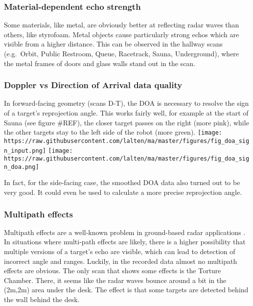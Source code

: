 \subsubsection{Material-dependent echo
strength}\label{material-dependent-echo-strength}

Some materials, like metal, are obviously better at reflecting radar
waves than others, like styrofoam. Metal objects cause particularly
strong echos which are visible from a higher distance. This can be
observed in the hallway scans (e.g.~Orbit, Public Restroom, Queue,
Racetrack, Sauna, Underground), where the metal frames of doors and
glass walls stand out in the scan.

\subsubsection{Doppler vs Direction of Arrival data
quality}\label{doppler-vs-direction-of-arrival-data-quality}

In forward-facing geometry (scans D-T), the DOA is necessary to resolve
the sign of a target's reprojection angle. This works fairly well, for
example at the start of Sauna (see figure \#REF), the closer target
passes on the right (more pink), while the other targets stay to the
left side of the robot (more green).
\texttt{[image: https://raw.githubusercontent.com/lalten/ma/master/figures/fig\_doa\_sign\_input.png]}
\texttt{[image: https://raw.githubusercontent.com/lalten/ma/master/figures/fig\_doa\_sign\_doa.png]}

In fact, for the side-facing case, the smoothed DOA data also turned out
to be very good. It could even be used to calculate a more precise
reprojection angle.

\subsubsection{Multipath effects}\label{multipath-effects}

Multipath effects are a well-known problem in ground-based radar
applications \cite{Adams2012}. In situations where multi-path effects
are likely, there is a higher possibility that multiple versions of a
target's echo are visible, which can lead to detection of incorrect
angle and ranges. Luckily, in the recorded data almost no multipath
effects are obvious. The only scan that shows some effects is the
Torture Chamber. There, it seems like the radar waves bounce around a
bit in the (2m,2m) area under the desk. The effect is that some targets
are detected behind the wall behind the desk.

